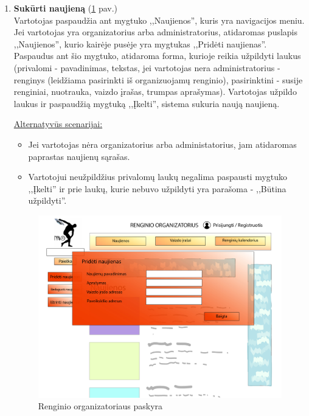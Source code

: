\documentclass{VUMIFPSkursinis}
\begin{document}
\begin{enumerate} [label = \textbf{U\arabic*.}]
					\underline{Alternatyvūs scenarijai:}
					\begin{itemize}
						\item Jei vartotojas spaudžia mygtuką ,,Skirti vadovu'' ir uždaro patvirtinimo langą. Vadovas nėra pakeičiamas.
						\item Jei vartotojas spaudžia ,,Skirti vadovu'', o pasirinktas vartotojas jau yra išėjęs iš komandos, jis pašalinamas iš sąrašo ir parodomas pranešimas kad pasirinktas vartojas nėra komandos narys.						
					\end{itemize}
				
			
				\item \textbf{Sukūrti naujieną} (\ref{fig:uzd_org_pridetiNaujienas} pav.)\\
					Vartotojas paspaudžia ant mygtuko ,,Naujienos'', kuris yra navigacijos meniu. Jei vartotojas yra organizatorius arba administratorius, atidaromas puslapis ,,Naujienos'', kurio kairėje pusėje yra mygtukas ,,Pridėti naujienas''. Paspaudus ant šio mygtuko, atidaroma forma, kurioje reikia užpildyti laukus (privalomi - pavadinimas, tekstas, jei vartotojas nera administratorius - renginys (leidžiama pasirinkti iš organizuojamų renginio), pasirinktini - susije renginiai, nuotrauka, vaizdo įrašas, trumpas aprašymas). Vartotojas užpildo laukus ir paspaudžią mygtuką ,,Įkelti'', sistema sukuria naują naujieną.
					
					\underline{Alternatyvūs scenarijai:}
					\begin{itemize}
						\item Jei vartotojas nėra organizatorius arba administatorius, jam atidaromas paprastas naujienų sąrašas.
						\item Vartotojui neužpildžius privalomų laukų negalima paspausti mygtuko ,,Įkelti'' ir prie laukų, kurie nebuvo užpildyti yra parašoma - ,,Būtina užpildyti''.
					\end{itemize}
				
				\begin{figure}[H]
					\centering
					\includegraphics[width=\textwidth]{img/PSI4/OrganizatoriusNaujienos-01.jpg}
					\caption{Renginio organizatoriaus paskyra}
					\label{fig:uzd_org_pridetiNaujienas}
				\end{figure}
			

\end{enumerate}
\end{document}
